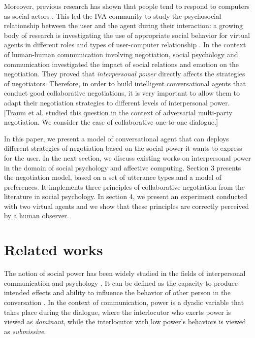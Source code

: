 \documentclass{article}
\begin{document}
	Moreover, previous research has shown that people tend to respond to computers as social actors \cite{bickmore2005establishing}. This led the IVA community to study the psychosocial relationship between the user and the agent during their interaction: a growing body of research is investigating the use of appropriate social behavior for virtual agents in different roles and types of user-computer relationship \cite{bickmore2005s,bickmore2005establishing,kidd2005sociable}. In the context of human-human communication involving negotiation, social psychology and communication \cite{dunbar2005perceptions,de1995impact} investigated the impact of social relations and emotion on the negotiation. They proved that  \emph{interpersonal power} directly affects the strategies of negotiators. Therefore, in order to build intelligent conversational agents that conduct good collaborative negotiations, it is very important to allow them to adapt their negotiation strategies to different levels of interpersonal power. [Traum et al. studied this question in the context of adversarial multi-party negotiation. We consider the case of collaborative one-to-one dialogue.]
	
	In this paper, we present a model of conversational agent that can deploys different strategies of negotiation based on the social power it wants to express for the user. In the next section, we discuss existing works on interpersonal power in the domain of social psychology and affective computing. Section 3 presents the negotiation model, based on a set of utterance types and a model of preferences. It implements three principles of collaborative negotiation from the literature in social psychology. In section 4, we present an experiment conducted with two virtual agents and we show that these principles are correctly perceived by a human observer.	
	
	\section{Related works}
	The notion of social power has been widely studied in the fields of interpersonal communication and psychology \cite{kecskes2013research}. It can be defined as the capacity to produce intended effects and ability to influence the behavior of other person in the conversation \cite{dunbar2005perceptions}. In the context of communication, power is a dyadic variable that takes place during the dialogue, where the interlocutor who exerts power is viewed as \textit{dominant}, while the interlocutor with low power's behaviors is viewed as \textit{submissive}. 
\end{document}

